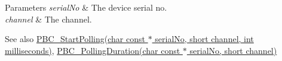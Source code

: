 \begin{DoxyParams}{Parameters}
{\em serial\+No} & The device serial no. \\
\hline
{\em channel} & The channel. \\
\hline
\end{DoxyParams}
\begin{DoxySeeAlso}{See also}
\hyperlink{group___modular_piezo_ga334d4f057f38fa5e9a5a37a823b6e3d6}{P\+B\+C\+\_\+\+Start\+Polling(char const $\ast$ serial\+No, short channel, int milliseconds)}, \hyperlink{group___modular_piezo_ga85c732352eaf8e125977f5a08ab51b3d}{P\+B\+C\+\_\+\+Polling\+Duration(char const $\ast$ serial\+No, short channel)}


\end{DoxySeeAlso}

\begin{DoxyCodeInclude}
\end{DoxyCodeInclude}
 